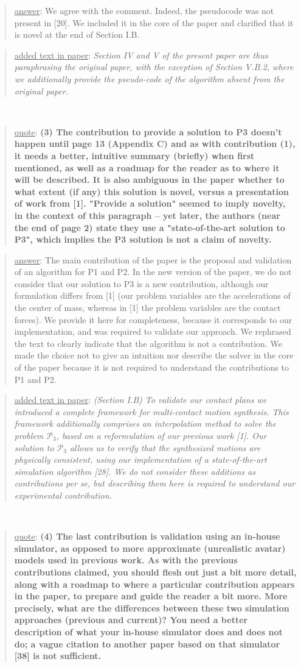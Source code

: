 \documentclass[a4paper]{article}
\newcommand{\done}[0]{}
\newcommand\quot[1]{\begin{quote} \underline{quote}: \textbf{#1}\end{quote}}
\newcommand\as[1]{\begin{quote} \underline{answer}: {#1}\end{quote} }
\newcommand\qt[1]{\begin{quote} \underline{added text in paper}: \textit{#1}\end{quote} \leavevmode \\ }
\begin{document}
\as{We agree with the comment. Indeed, the pseudocode was not present in [20]. We included it in the core of the paper and clarified that it is novel at the end
of Section I.B.}
\qt{Section IV and V of the present paper are thus paraphrasing the original paper, with the exception of Section V.B.2, where we additionally provide the pseudo-code of the algorithm absent from the original paper.}
\done


\quot{(3)	The contribution to provide a solution to P3 doesn't happen
until page 13 (Appendix C) and as with contribution (1), it needs a
better, intuitive summary (briefly) when first mentioned, as well as a
roadmap for the reader as to where it will be described. It is also
ambiguous in the paper whether to what extent (if any) this solution is
novel, versus a presentation of work from [1]. "Provide a solution"
seemed to imply novelty, in the context of this paragraph -- yet later,
the authors (near the end of page 2) state they use a "state-of-the-art
solution to P3", which implies the P3 solution is not a claim of
novelty.}

\as{The main contribution of the paper is the proposal and validation of an algorithm for P1 and P2. 
In the new version of the paper, we do not consider that our solution to P3
is a new contribution, although our formulation differs from [1] (our problem variables are the accelerations
of the center of mass, whereas in [1] the problem variables are the contact forces). We provide it here for completeness, because it corresponds to our implementation, and 
was required to validate our approach. 
We rephrased the text to clearly indicate that the algorithm is not a contribution. We made the choice not to give an intuition nor describe the solver in the core
of the paper because it is not required to understand the contributions to P1 and P2.}
\qt{(Section I.B) To validate our contact plans we introduced a complete framework for multi-contact motion synthesis. This framework additionally comprises an interpolation method to solve the problem $\mathcal{P}_3$,  based on a reformulation of our previous work [1]. Our solution to $\mathcal{P}_3$ allows us to verify that the synthesized motions are physically consistent, using our implementation of a state-of-the-art simulation algorithm [28]. 
We do not consider these additions as contributions \textit{per se}, but describing them here is required to understand our experimental contribution.}\done

\quot{
(4)	The last contribution is validation using an in-house
simulator, as opposed to more approximate (unrealistic avatar) models
used in previous work.	As with the previous contributions claimed, you
should flesh out just a bit more detail, along with a roadmap to where
a particular contribution appears in the paper, to prepare and guide
the reader a bit more. More precisely, what are the differences between
these two simulation approaches (previous and current)? You need a
better description of what your in-house simulator does and does not
do; a vague citation to another paper based on that simulator [38] is
not sufficient.}
\end{document}
